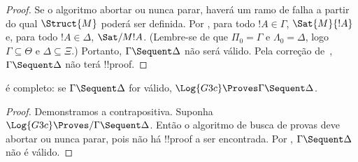 \documentclass[../../../include/open-logic-section]{subfiles}
\begin{document}
\begin{proof}
  Se o algoritmo abortar ou nunca parar, haverá um ramo de falha a
  partir do qual $\Struct{M}$ poderá ser definida. Por ,
  para todo $!A \in \Gamma$, $\Sat{M}{!A}$ e, para todo $!A \in \Delta$,
  $\Sat/{M}{!A}$. (Lembre-se de que $\Pi_0 = \Gamma$ e $\Lambda_0 =
  \Delta$, logo $\Gamma \subseteq \Theta$ e $\Delta \subseteq \Xi$.)
  Portanto, $\Gamma \Sequent \Delta$ não será válido. Pela correção
  de~, $\Gamma \Sequent \Delta$ não terá !!{proof}.
\end{proof}

\begin{cor}
 é completo: se $\Gamma \Sequent \Delta$ for válido,
$\Log{G3c} \Proves \Gamma \Sequent \Delta$.
\end{cor}

\begin{proof}
  Demonstramos a contrapositiva. Suponha $\Log{G3c} \Proves/ \Gamma
  \Sequent \Delta$. Então o algoritmo de busca de provas deve abortar
  ou nunca parar, pois não há !!{proof} a ser encontrada. Por
  , $\Gamma \Sequent \Delta$ não é válido.
\end{proof}
\end{document}
